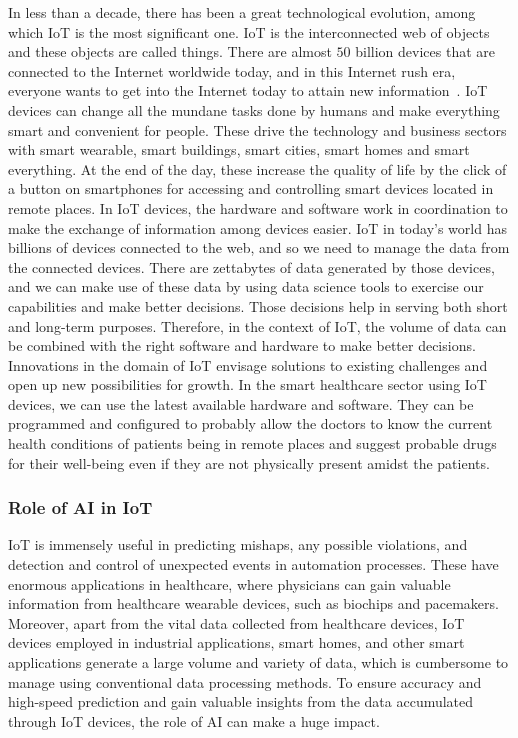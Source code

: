 \documentclass[journal]{IEEEtran}
\begin{document}
In less than a decade, there has been a great technological evolution, among which IoT is the most significant one. IoT is the interconnected web of objects and these objects are called things. There are almost $50$ billion devices that are connected to the Internet worldwide today, and in this Internet rush era, everyone wants to get into the Internet today to attain new information~\cite{chegini2021process}. IoT devices can change all the mundane tasks done by humans and make everything smart and convenient for people. These drive the technology and business sectors with smart wearable, smart buildings, smart cities, smart homes and smart everything. At the end of the day, these increase the quality of life by the click of a button on smartphones for accessing and controlling smart devices located in remote places. In IoT devices, the hardware and software work in coordination to make the exchange of information among devices easier. IoT in today's world has billions of devices connected to the web, and so we need to manage the data from the connected devices. There are zettabytes of data generated by those devices, and we can make use of these data by using data science tools to exercise our capabilities and make better decisions. Those decisions help in serving both short and long-term purposes. Therefore, in the context of IoT, the volume of data can be combined with the right software and hardware to make better decisions. Innovations in the domain of IoT envisage solutions to existing challenges and open up new possibilities for growth. In the smart healthcare sector using IoT devices, we can use the latest available hardware and software. They can be programmed and configured to probably allow the doctors to know the current health conditions of patients being in remote places and suggest probable drugs for their well-being even if they are not physically present amidst the patients. 

\subsubsection{Role of AI in IoT}

IoT is immensely useful in predicting mishaps, any possible violations, and detection and control of unexpected events in automation processes. These have enormous applications in healthcare, where physicians can gain valuable information from healthcare wearable devices, such as biochips and pacemakers. Moreover, apart from the vital data collected from healthcare devices, IoT devices employed in industrial applications, smart homes, and other smart applications generate a large volume and variety of data, which is cumbersome to manage using conventional data processing methods. To ensure accuracy and high-speed prediction and gain valuable insights from the data accumulated through IoT devices, the role of AI can make a huge impact. 
\end{document}
